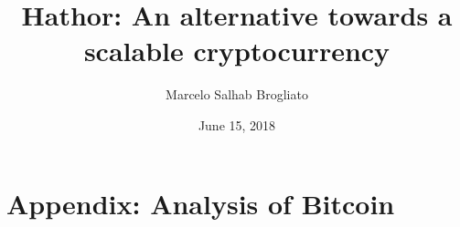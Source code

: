 \documentclass[12pt,a4paper]{article}
\title{Hathor: An alternative towards a scalable cryptocurrency}
\author{Marcelo Salhab Brogliato}
\date{June 15, 2018}
\begin{document}
\maketitle








%


%


\section{Appendix: Analysis of Bitcoin}
\label{ch:hathor-bitcoin-math}

\end{document}
